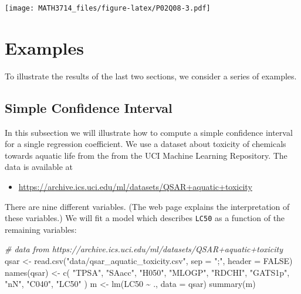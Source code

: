\documentclass[
  a4paper,
]{article}
\newenvironment{Shaded}{\begin{snugshade}}{\end{snugshade}}
\newcommand{\AttributeTok}[1]{\textcolor[rgb]{0.77,0.63,0.00}{#1}}
\newcommand{\CommentTok}[1]{\textcolor[rgb]{0.56,0.35,0.01}{\textit{#1}}}
\newcommand{\ConstantTok}[1]{\textcolor[rgb]{0.00,0.00,0.00}{#1}}
\newcommand{\FunctionTok}[1]{\textcolor[rgb]{0.00,0.00,0.00}{#1}}
\newcommand{\NormalTok}[1]{#1}
\newcommand{\OtherTok}[1]{\textcolor[rgb]{0.56,0.35,0.01}{#1}}
\newcommand{\SpecialCharTok}[1]{\textcolor[rgb]{0.00,0.00,0.00}{#1}}
\newcommand{\StringTok}[1]{\textcolor[rgb]{0.31,0.60,0.02}{#1}}
\providecommand{\tightlist}{%
  \setlength{\itemsep}{0pt}\setlength{\parskip}{0pt}}
\theoremstyle{definition}
\theoremstyle{definition}
\theoremstyle{definition}
\theoremstyle{definition}
\theoremstyle{remark}
\begin{document}
\begin{myanswers}
\texttt{[image: MATH3714\_files/figure-latex/P02Q08-3.pdf]}

\end{myanswers}

\clearpage

\hypertarget{S07-examples}{%
\section{Examples}\label{S07-examples}}

To illustrate the results of the last two sections, we consider a series
of examples.

\hypertarget{simple-confidence-interval}{%
\subsection{Simple Confidence Interval}\label{simple-confidence-interval}}

In this subsection we will illustrate how to compute a simple confidence interval
for a single regression coefficient. We use a dataset about toxicity of
chemicals towards aquatic life from the from the UCI Machine Learning
Repository. The data is available at

\begin{itemize}
\tightlist
\item
  \url{https://archive.ics.uci.edu/ml/datasets/QSAR+aquatic+toxicity}
\end{itemize}

There are nine different variables. (The web page explains the interpretation
of these variables.) We will fit a model which describes \texttt{LC50} as a function
of the remaining variables:

\begin{Shaded}
\begin{Highlighting}[]
\CommentTok{\# data from https://archive.ics.uci.edu/ml/datasets/QSAR+aquatic+toxicity}
\NormalTok{qsar }\OtherTok{\textless{}{-}} \FunctionTok{read.csv}\NormalTok{(}\StringTok{"data/qsar\_aquatic\_toxicity.csv"}\NormalTok{, }\AttributeTok{sep =} \StringTok{";"}\NormalTok{, }\AttributeTok{header =} \ConstantTok{FALSE}\NormalTok{)}
\FunctionTok{names}\NormalTok{(qsar) }\OtherTok{\textless{}{-}} \FunctionTok{c}\NormalTok{(}
    \StringTok{"TPSA"}\NormalTok{,}
    \StringTok{"SAacc"}\NormalTok{,}
    \StringTok{"H050"}\NormalTok{,}
    \StringTok{"MLOGP"}\NormalTok{,}
    \StringTok{"RDCHI"}\NormalTok{,}
    \StringTok{"GATS1p"}\NormalTok{,}
    \StringTok{"nN"}\NormalTok{,}
    \StringTok{"C040"}\NormalTok{,}
    \StringTok{"LC50"}
\NormalTok{)}
\NormalTok{m }\OtherTok{\textless{}{-}} \FunctionTok{lm}\NormalTok{(LC50 }\SpecialCharTok{\textasciitilde{}}\NormalTok{ ., }\AttributeTok{data =}\NormalTok{ qsar)}
\FunctionTok{summary}\NormalTok{(m)}
\end{Highlighting}
\end{Shaded}
\end{document}
